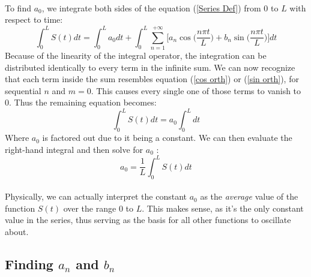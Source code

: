 \documentclass[12pt,letterpaper]{article}
\begin{document}
\paragraph*{}To find $a_0$, we integrate both sides of the equation (\ref{Series Def}) from $0$ to $L$ with respect to time:
\begin{equation}
\int_{0}^{L}S(t)dt = \int_{0}^{L}a_0dt + \int_{0}^{L}\sum_{n=1}^{+\infty} 
\Bigg[ a_n \cos\Big(\frac{n\pi t}{L}\Big) + b_n \sin\Big(\frac{n\pi t}{L}\Big) \Bigg] dt
\end{equation}
Because of the linearity of the integral operator, the integration can be distributed identically to every term in the infinite sum. We can now recognize that each term inside the sum resembles equation (\ref{cos orth}) or (\ref{sin orth}), for sequential $n$ and $m = 0$. This causes every single one of those terms to vanish to $0$. Thus the remaining equation becomes:
\begin{equation}
\int_{0}^{L}S(t)dt = a_0\int_{0}^{L}dt
\end{equation}
Where $a_0$ is factored out due to it being a constant. We can then evaluate the right-hand integral and then solve for $a_0$ \cite{Haberman}:
\begin{equation}
\label{a_0}
a_0 = \frac{1}{L}\int_{0}^{L}S(t)dt
\end{equation}
\paragraph*{}Physically, we can actually interpret the constant $a_0$ as the \textit{average} value of the function $S(t)$ over the range $0$ to $L$. This makes sense, as it's the only constant value in the series, thus serving as the basis for all other functions to oscillate about. 


\subsection*{Finding $a_n$ and $b_n$}
\end{document}
